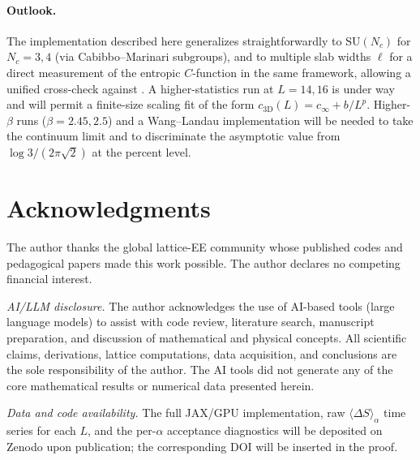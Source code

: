 \documentclass[aps,prl,reprint,superscriptaddress,floatfix,nofootinbib,amssymb]{revtex4-2}
\newcommand{\SUN}{\mathrm{SU}(N_c)}
\begin{document}
\paragraph{Outlook.}
The implementation described here generalizes straightforwardly to $\SUN$ for $N_c=3,4$ (via Cabibbo--Marinari subgroups), and to multiple slab widths $\ell$ for a direct measurement of the entropic $C$-function in the same framework, allowing a unified cross-check against \cite{Rabenstein2019}. A higher-statistics run at $L=14,16$ is under way and will permit a finite-size scaling fit of the form $c_{3\text{D}}(L) = c_\infty + b/L^p$. Higher-$\beta$ runs ($\beta=2.45, 2.5$) and a Wang--Landau implementation \cite{Rindlisbacher2022} will be needed to take the continuum limit and to discriminate the asymptotic value from $\log 3/(2\pi\sqrt 2)$ at the percent level.

\section*{Acknowledgments}
The author thanks the global lattice-EE community whose published codes and pedagogical papers made this work possible. The author declares no competing financial interest.

\emph{AI/LLM disclosure.}
The author acknowledges the use of AI-based tools (large language models)
to assist with code review, literature search, manuscript preparation,
and discussion of mathematical and physical concepts. All scientific
claims, derivations, lattice computations, data acquisition, and conclusions
are the sole responsibility of the author. The AI tools did not generate any
of the core mathematical results or numerical data presented herein.

\bigskip

\emph{Data and code availability.}
The full JAX/GPU implementation, raw $\langle\Delta S\rangle_\alpha$ time series for each $L$, and the per-$\alpha$ acceptance diagnostics will be deposited on Zenodo upon publication; the corresponding DOI will be inserted in the proof.
\end{document}
